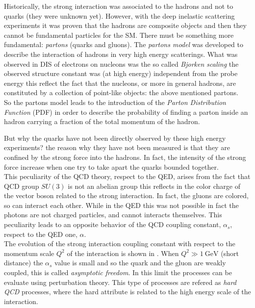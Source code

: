 Historically, the strong interaction was associated to the hadrons and not to quarks (they were unknown yet). However, with the deep inelastic scattering experiments \cite{DIS} it was proven that the hadrons are composite objects and then they cannot be fundamental particles for the SM. There must be something more fundamental: \textit{partons} (quarks and gluons). The \textit{partons model} \cite{Feynman:1969wa} was developed to describe the interaction of hadrons in very high energy scatterings. What was observed in DIS of electrons on nucleons was the so called \textit{Bjorken scaling} the observed structure constant was (at high energy) independent from the probe energy this reflect the fact that the nucleons, or more in general hadrons, are constituted by a collection of point-like objects: the above mentioned partons.
\\
So the partons model leads to the introduction of the \textit{Parton Distribution Function} (PDF) in order to describe the probability of finding a parton inside an hadron carrying a fraction of the total momentum of the hadron. 

\medskip

But why the quarks have not been directly observed by these high energy experiments? the reason why they have not been measured is that they are confined by the strong force into the hadrons. In fact, the intensity of the strong force increase when one try to take apart the quarks bounded together. 
\\
This peculiarity of the QCD theory, respect to the QED, arises from the fact that QCD group $SU(3)$ is not an abelian group this reflects in the color charge of the vector boson related to the strong interaction. In fact, the gluons are colored, so can interact each other. While in the QED this was not possible in fact the photons are not charged particles, and cannot interacts themselves. This peculiarity leads to an opposite behavior of the QCD coupling constant, $\alpha_s$, respect to the QED one, $\alpha$.   
\\
The evolution of the strong interaction coupling constant with respect to the momentum scale $Q^2$ of the interaction is shown in . When $Q^2\gg 1 \ \mathrm{GeV}$ (short distance) the $\alpha_s$ value is small and so the quark and the gluon are weakly coupled, this is called \textit{asymptotic freedom}. In this limit the processes can be evaluate using perturbation theory. This type of processes are refered as \textit{hard QCD} processes, where the hard attribute is related to the high energy scale of the interaction.   

